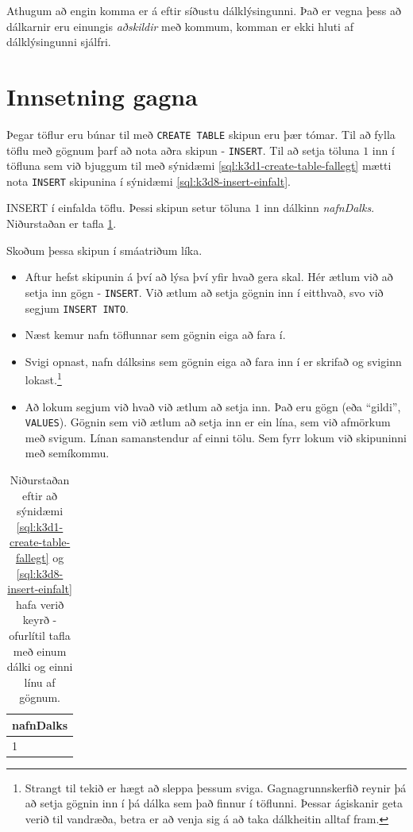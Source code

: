 Athugum að engin komma er á eftir síðustu dálklýsingunni. Það er vegna þess að dálkarnir eru einungis \emph{aðskildir} með kommum, komman er ekki hluti af dálklýsingunni sjálfri.
\section{Innsetning gagna} %
\label{undirkafli:innsetning}
Þegar töflur eru búnar til með \verb|CREATE TABLE| skipun eru þær tómar. Til að fylla töflu með gögnum þarf að nota aðra skipun - \verb|INSERT|. Til að setja töluna $1$ inn í töfluna sem við bjuggum til með sýnidæmi \ref{sql:k3d1-create-table-fallegt} mætti nota \verb|INSERT| skipunina í sýnidæmi \ref{sql:k3d8-insert-einfalt}.

\begin{example}
\caption[INSERT í einfalda töflu]{INSERT í einfalda töflu. Þessi skipun setur töluna $1$ inn dálkinn \emph{nafnDalks}. Niðurstaðan er tafla \ref{tafla:insert-einfalt}.}
\label{sql:k3d8-insert-einfalt}
\centering
{}
\end{example}

Skoðum þessa skipun í smáatriðum líka. 

\begin{itemize}
 \item Aftur hefst skipunin á því að lýsa því yfir hvað gera skal. Hér ætlum við að setja inn gögn - \verb|INSERT|. Við ætlum að setja gögnin inn í eitthvað, svo við segjum \verb|INSERT INTO|.
 \item Næst kemur nafn töflunnar sem gögnin eiga að fara í. %
 \item Svigi opnast, nafn dálksins sem gögnin eiga að fara inn í er skrifað og sviginn lokast.\footnote{Strangt til tekið er hægt að sleppa þessum sviga. Gagnagrunnskerfið reynir þá að setja gögnin inn í þá dálka sem það finnur í töflunni. Þessar ágiskanir geta verið til vandræða, betra er að venja sig á að taka dálkheitin alltaf fram.}
 \item Að lokum segjum við hvað við ætlum að setja inn. Það eru gögn (eða ``gildi'', \verb|VALUES|). Gögnin sem við ætlum að setja inn er ein lína, sem við afmörkum með svigum. Línan samanstendur af einni tölu. Sem fyrr lokum við skipuninni með semíkommu.
\end{itemize}

\begin{table}
\centering
\caption[Eftir einfalt INSERT]{Niðurstaðan eftir að sýnidæmi \ref{sql:k3d1-create-table-fallegt} og \ref{sql:k3d8-insert-einfalt} hafa verið keyrð - ofurlítil tafla með einum dálki og einni línu af gögnum.}
\label{tafla:insert-einfalt}
\begin{tabular}{l}
\toprule
nafnDalks\\
\midrule
1\\
\bottomrule
\end{tabular}
\end{table}

